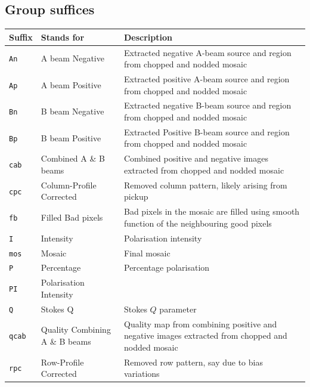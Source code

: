 \documentclass[twoside,11pt]{article}
\renewcommand{\_}{\texttt{\symbol{95}}}
\begin{document}
\subsection*{Group suffices}%
\begin{tabular}{llp{80mm}}
\hline
  Suffix   & Stands for             & Description \\ \hline
{\tt\_An}  & A beam Negative        & Extracted negative A-beam source and
                                      region from chopped and nodded mosaic \\
{\tt\_Ap}  & A beam Positive        & Extracted positive A-beam source and 
                                      region from chopped and nodded mosaic \\
{\tt\_Bn}  & B beam Negative        & Extracted negative B-beam source and
                                      region from chopped and nodded mosaic \\
{\tt\_Bp}  & B beam Positive        & Extracted Positive B-beam source and 
                                      region from chopped and nodded mosaic \\
{\tt\_cab} & Combined A \& B beams  & Combined positive and negative images
                                      extracted from chopped and nodded mosaic \\
{\tt\_cpc} & Column-Profile Corrected  & Removed column pattern, likely arising
                                      from pickup \\
{\tt\_fb}  & Filled Bad pixels      & Bad pixels in the mosaic are filled using
                                      smooth function of the neighbouring good
                                      pixels \\
{\tt\_I}   & Intensity              & Polarisation intensity \\
{\tt\_mos} & Mosaic                 & Final mosaic \\
{\tt\_P}   & Percentage             & Percentage polarisation \\
{\tt\_PI}  & Polarisation Intensity & \\
{\tt\_Q}   & Stokes Q               & Stokes $Q$ parameter \\
{\tt\_qcab} & Quality Combining A \& B beams  & Quality map from combining positive and
                                      negative images extracted from chopped and nodded mosaic \\
{\tt\_rpc} & Row-Profile Corrected  & Removed row pattern, say due to bias
                                      variations \\

\end{tabular}
\end{document}
